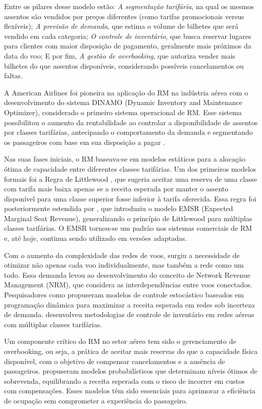 Entre os pilares desse modelo estão: \textit{A segmentação tarifária}, na qual os mesmos assentos são vendidos por preços diferentes (como tarifas promocionais versus flexíveis); \textit{A previsão de demanda}, que estima o volume de bilhetes que será vendido em cada categoria; \textit{O controle de inventário}, que busca reservar lugares para clientes com maior disposição de pagamento, geralmente mais próximos da data do voo; E por fim, \textit{A gestão de overbooking}, que autoriza vender mais bilhetes do que assentos disponíveis, considerando possíveis cancelamentos ou faltas.

A American Airlines foi pioneira na aplicação do RM na indústria aérea com o desenvolvimento do sistema DINAMO (Dynamic Inventory and Maintenance Optimizer), considerado o primeiro sistema operacional de RM. Esse sistema possibilitou o aumento da rentabilidade ao controlar a disponibilidade de assentos por classes tarifárias, antecipando o comportamento da demanda e segmentando os passageiros com base em sua disposição a pagar \citep{Smith1992}.

Nas suas fases iniciais, o RM baseava-se em modelos estáticos para a alocação ótima de capacidade entre diferentes classes tarifárias. Um dos primeiros modelos formais foi a Regra de Littlewood \citep{article_YM_to_RM}, que sugeria aceitar uma reserva de uma classe com tarifa mais baixa apenas se a receita esperada por manter o assento disponível para uma classe superior fosse inferior à tarifa oferecida. Essa regra foi posteriormente estendida por \citep{Belobaba1987}, que introduziu o modelo EMSR (Expected Marginal Seat Revenue), generalizando o princípio de Littlewood para múltiplas classes tarifárias. O EMSR tornou-se um padrão nos sistemas comerciais de RM e, até hoje, continua sendo utilizado em versões adaptadas.

Com o aumento da complexidade das redes de voos, surgiu a necessidade de otimizar não apenas cada voo individualmente, mas também a rede como um todo. Essa demanda levou ao desenvolvimento do conceito de Network Revenue Management (NRM), que considera as interdependências entre voos conectados. Pesquisadores como \citep{Gallego_Ryzin1997} propuseram modelos de controle estocástico baseados em programação dinâmica para maximizar a receita esperada em redes sob incerteza de demanda. \citep{Williamson1992AirlineNS} desenvolveu metodologias de controle de inventário em redes aéreas com múltiplas classes tarifárias.

Um componente crítico do RM no setor aéreo tem sido o gerenciamento de overbooking, ou seja, a prática de aceitar mais reservas do que a capacidade física disponível, com o objetivo de compensar cancelamentos e a ausência de passageiros. \citep{Brumelle_1993} propuseram modelos probabilísticos que determinam níveis ótimos de sobrevenda, equilibrando a receita esperada com o risco de incorrer em custos com compensações. Esses modelos têm sido essenciais para aprimorar a eficiência de ocupação sem comprometer a experiência do passageiro.

